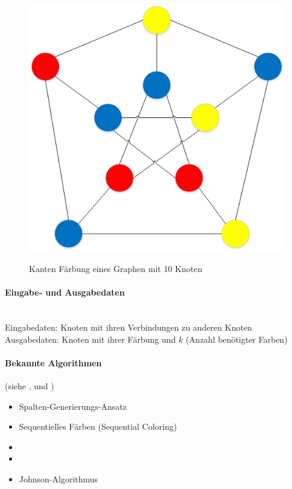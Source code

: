 \begin{figure}[ht]
{  \includegraphics[scale=0.5]{images/visio/graph_faerbung_correct.png}
  \label{fig:graph_faerbung_correct}
}
\label{fig:graph_faerbung}
\caption{Kanten Färbung eines Graphen mit 10 Knoten}
\end{figure}

	\paragraph{Eingabe- und Ausgabedaten}\mbox{}\\
	Eingabedaten: Knoten mit ihren Verbindungen zu anderen Knoten\\
	Ausgabedaten: Knoten mit ihrer Färbung und $k$ (Anzahl benötigter Farben)

	\paragraph{Bekannte Algorithmen}
	(siehe \cite{seminar_algo_graph}, \cite{krumke2012graphentheoretische} und \cite{seminar_rob_graphen})
	\begin{itemize}
		\item Spalten-Generierungs-Ansatz
		\item Sequentielles Färben (Sequential Coloring)
		\item {}
		\item {}
		\item Johnson-Algorithmus
	\end{itemize}	

